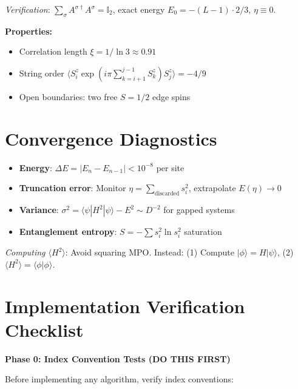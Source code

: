 \documentclass[aps,prb,onecolumn,scriptaddress]{revtex4-2}
\newcommand{\ket}[1]{|#1\rangle}
\newcommand{\bra}[1]{\langle#1|}
\newcommand{\braket}[2]{\langle#1|#2\rangle}
\begin{document}
\textit{Verification}: $\sum_{\sigma} A^{\sigma\dagger} A^{\sigma} = \mathbb{I}_2$, exact energy $E_0 = -(L-1) \cdot 2/3$, $\eta \equiv 0$.

\textbf{Properties:}
\begin{itemize}
\item Correlation length $\xi = 1/\ln 3 \approx 0.91$
\item String order $\langle S^z_i \exp(i\pi \sum_{k=i+1}^{j-1} S^z_k) S^z_j \rangle = -4/9$
\item Open boundaries: two free $S=1/2$ edge spins
\end{itemize}

\section{Convergence Diagnostics}

\begin{itemize}
\item \textbf{Energy}: $\Delta E = |E_{n} - E_{n-1}| < 10^{-8}$ per site
\item \textbf{Truncation error}: Monitor $\eta = \sum_{\text{discarded}} s_i^2$, extrapolate $E(\eta) \to 0$
\item \textbf{Variance}: $\sigma^2 = \bra{\psi}H^2\ket{\psi} - E^2 \sim D^{-2}$ for gapped systems
\item \textbf{Entanglement entropy}: $S = -\sum s_i^2 \ln s_i^2$ saturation
\end{itemize}

\textit{Computing $\langle H^2 \rangle$}: Avoid squaring MPO. Instead: (1) Compute $\ket{\phi} = H\ket{\psi}$, (2) $\langle H^2 \rangle = \braket{\phi}{\phi}$.

\section{Implementation Verification Checklist}
\label{sec:verification}

\textbf{Phase 0: Index Convention Tests (DO THIS FIRST)}

Before implementing any algorithm, verify index conventions:
\end{document}
